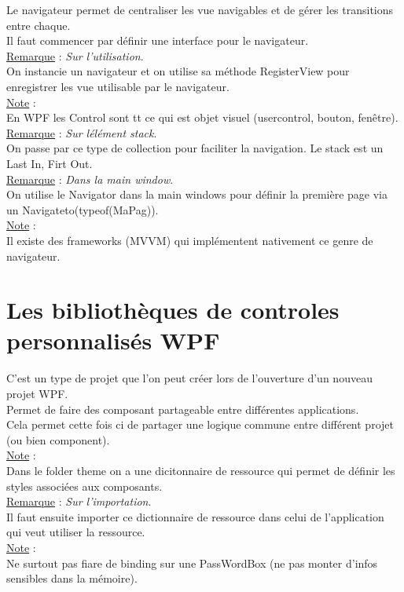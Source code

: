 \documentclass[a4paper,12pt,twoside]{article}
\newcommand{\incode}[1]{{\footnotesize\ttfamily #1}} %
\newcommand{\rem}[2]{\noindent\underline{Remarque} : \textit{#1}.\\ \indent #2}
\newcommand{\note}[1]{\noindent\underline{Note} : \\ \indent #1}
\begin{document}
Le navigateur permet de centraliser les vue navigables et de gérer les transitions entre chaque.\\
Il faut commencer par définir une interface pour le navigateur.\\

\rem{Sur l'utilisation}{On instancie un navigateur et on utilise sa méthode RegisterView pour enregistrer les vue utilisable par le navigateur.}\\

\note{En WPF les Control sont tt ce qui est objet visuel (usercontrol, bouton, fenêtre).}\\

\rem{Sur lélément stack}{On passe par ce type de collection pour faciliter la navigation. Le stack est un Last In, Firt Out.}\\

\rem{Dans la main window}{On utilise le Navigator dans la main windows pour définir la première page via un Navigateto(typeof(MaPag)).}\\

\note{Il existe des frameworks (MVVM) qui implémentent nativement ce genre de navigateur.}\\

\section{Les bibliothèques de controles personnalisés WPF}

C'est un type de projet que l'on peut créer lors de l'ouverture d'un nouveau projet WPF.\\
Permet de faire des composant partageable entre différentes applications.\\
Cela permet cette fois ci de partager une logique commune entre différent projet (ou bien component).\\

\note{Dans le folder theme on a une dicitonnaire de ressource qui permet de définir les styles associées aux composants.}\\

\rem{Sur l'importation}{Il faut ensuite importer ce dictionnaire de ressource dans celui de l'application qui veut utiliser la ressource.}\\

\note{Ne surtout pas fiare de binding sur une \incode{PassWordBox} (ne pas monter d'infos sensibles dans la mémoire).}\\



\end{document}
